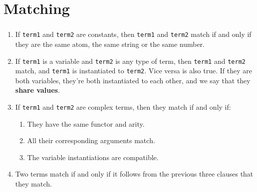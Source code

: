 \section{Matching}


\begin{frame}
	\frametitle{\insertsection}
	\begin{enumerate}
		\item If \texttt{term1} and \texttt{term2} are constants, then \texttt{term1} and \texttt{term2} match if and only if they are the same atom, the same string or the same number.
		\item If \texttt{term1} is a variable and \texttt{term2} is any type of term, then \texttt{term1} and \texttt{term2} match, and \texttt{term1} is instantiated to \texttt{term2}. Vice versa is also true. If they are both variables, they’re both instantiated to each other, and we say that they \textbf{share values}.
		\item If \texttt{term1} and \texttt{term2} are complex terms, then they match if and only if:
		\begin{enumerate}
			\item They have the same functor and arity.
			\item All their corresponding arguments match.
			\item The variable instantiations are compatible.
		\end{enumerate}
		\item Two terms match if and only if it follows from the previous three clauses that they match.
	\end{enumerate}
\end{frame}

